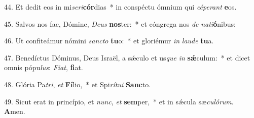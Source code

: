 44. Et dedit eos in mi\textit{se}\textit{ri}\textbf{cór}dias~*  in conspéctu ómnium qui \textit{cé}\textit{pe}\textit{rant} \textbf{e}os.\

45. Salvos nos fac, Dómine, \textit{De}\textit{us} \textbf{nos}ter:~*  et cóngrega nos \textit{de} \textit{na}\textit{ti}\textbf{ó}nibus:\

46. Ut confiteámur nómini \textit{sanc}\textit{to} \textbf{tu}o:~*  et gloriémur \textit{in} \textit{lau}\textit{de} \textbf{tu}a.\

47. Benedíctus Dóminus, Deus Israël, a sǽculo et us\textit{que} \textit{in} \textbf{sǽ}culum:~*  et dicet omnis pópu\textit{lus}: \textit{Fi}\textit{at}, \textbf{fi}at.\

48. Glória Pa\textit{tri}, \textit{et} \textbf{Fí}lio,~*  et Spi\textit{rí}\textit{tu}\textit{i} \textbf{Sanc}to.\

49. Sicut erat in princípio, et \textit{nunc}, \textit{et} \textbf{sem}per,~*  et in sǽcula sæ\textit{cu}\textit{ló}\textit{rum}. \textbf{A}men.\


